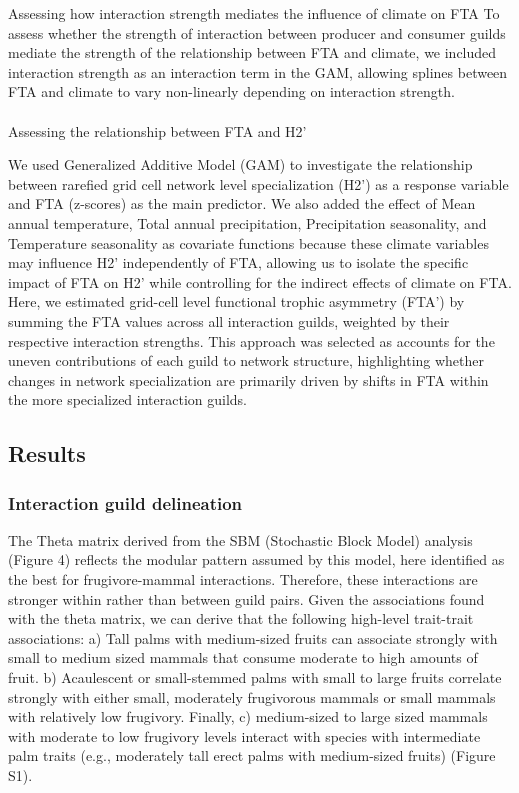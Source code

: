 \documentclass[
]{agujournal2019}
\makeatletter
\let\oldparagraph\paragraph
\renewcommand{\paragraph}{
    \@ifstar
      \xxxParagraphStar
      \xxxParagraphNoStar
  }
\newcommand{\xxxParagraphStar}[1]{\oldparagraph*{#1}\mbox{}}
\newcommand{\xxxParagraphNoStar}[1]{\oldparagraph{#1}\mbox{}}
\makeatother
\begin{document}
Assessing how interaction strength mediates the influence of climate on
FTA To assess whether the strength of interaction between producer and
consumer guilds mediate the strength of the relationship between FTA and
climate, we included interaction strength as an interaction term in the
GAM, allowing splines between FTA and climate to vary non-linearly
depending on interaction strength.

\paragraph{Assessing the relationship between FTA and
H2'}\label{assessing-the-relationship-between-fta-and-h2}

We used Generalized Additive Model (GAM) to investigate the relationship
between rarefied grid cell network level specialization (H2') as a
response variable and FTA (z-scores) as the main predictor. We also
added the effect of Mean annual temperature, Total annual precipitation,
Precipitation seasonality, and Temperature seasonality as covariate
functions because these climate variables may influence H2'
independently of FTA, allowing us to isolate the specific impact of FTA
on H2' while controlling for the indirect effects of climate on FTA.
Here, we estimated grid-cell level functional trophic asymmetry (FTA')
by summing the FTA values across all interaction guilds, weighted by
their respective interaction strengths. This approach was selected as
accounts for the uneven contributions of each guild to network
structure, highlighting whether changes in network specialization are
primarily driven by shifts in FTA within the more specialized
interaction guilds.

\subsection{Results}\label{results}

\subsubsection{Interaction guild
delineation}\label{interaction-guild-delineation}

The Theta matrix derived from the SBM (Stochastic Block Model) analysis
(Figure 4) reflects the modular pattern assumed by this model, here
identified as the best for frugivore-mammal interactions. Therefore,
these interactions are stronger within rather than between guild pairs.
Given the associations found with the theta matrix, we can derive that
the following high-level trait-trait associations: a) Tall palms with
medium-sized fruits can associate strongly with small to medium sized
mammals that consume moderate to high amounts of fruit. b) Acaulescent
or small-stemmed palms with small to large fruits correlate strongly
with either small, moderately frugivorous mammals or small mammals with
relatively low frugivory. Finally, c) medium-sized to large sized
mammals with moderate to low frugivory levels interact with species with
intermediate palm traits (e.g., moderately tall erect palms with
medium-sized fruits) (Figure S1).
\end{document}
